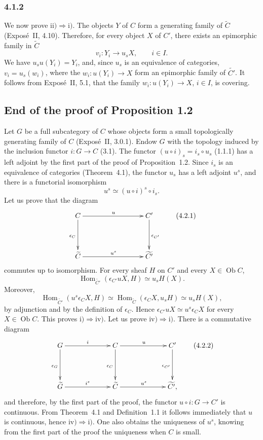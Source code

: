 \documentclass[11pt]{article}
\newcommand{\Hom}{\operatorname{Hom}}
\newcommand{\Ob}{\operatorname{Ob}}
\begin{document}
\subsubsection*{4.1.2}
We now prove \(\mathrm{ii)}\Rightarrow\mathrm{i)}\). The objects \(Y\) of \(C\) form a generating family of \(\widetilde C\) (Expos\'e~II, 4.10). Therefore, for every object \(X\) of \(C'\), there exists an epimorphic family in \(\widetilde C\)
\[
v_i:Y_i\to u_sX,
\qquad i\in I.
\]
We have \(u_su(Y_i)=Y_i\), and, since \(u_s\) is an equivalence of categories, \(v_i=u_s(w_i)\), where the \(w_i:u(Y_i)\to X\) form an epimorphic family of \(\widetilde{C'}\). It follows from Expos\'e~II, 5.1, that the family \(w_i:u(Y_i)\to X\), \(i\in I\), is covering.

\subsection{End of the proof of Proposition 1.2}
Let \(G\) be a full subcategory of \(C\) whose objects form a small topologically generating family of \(C\) (Expos\'e~II, 3.0.1). Endow \(G\) with the topology induced by the inclusion functor \(i:G\to C\) (3.1). The functor \((u\circ i)_s=i_s\circ u_s\) (1.1.1) has a left adjoint by the first part of the proof of Proposition~1.2. Since \(i_s\) is an equivalence of categories (Theorem~4.1), the functor \(u_s\) has a left adjoint \(u^s\), and there is a functorial isomorphism
\[
u^s\simeq (u\circ i)^s\circ i_s.
\]
Let us prove that the diagram
\[
\xymatrix@C=3cm@R=1.5cm{
C\ar[r]^{u}\ar[d]_{\epsilon_C}& C'\ar[d]^{\epsilon_{C'}}\\
\widetilde C\ar[r]^{u^s}& \widetilde{C'}
}
\tag{4.2.1}
\]
commutes up to isomorphism. For every sheaf \(H\) on \(C'\) and every \(X\in\Ob C\),
\[
\Hom_{\widetilde{C'}}(\epsilon_{C'}uX,H)\simeq u_sH(X).
\]
Moreover,
\[
\Hom_{\widetilde{C'}}(u^s\epsilon_CX,H)\simeq\Hom_{\widetilde C}(\epsilon_CX,u_sH)\simeq u_sH(X),
\]
by adjunction and by the definition of \(\epsilon_C\). Hence \(\epsilon_{C'}uX\simeq u^s\epsilon_CX\) for every \(X\in\Ob C\). This proves \(\mathrm{i)}\Rightarrow\mathrm{iv)}\). Let us prove \(\mathrm{iv)}\Rightarrow\mathrm{i)}\). There is a commutative diagram
\[
\xymatrix@C=2.25cm@R=1.5cm{
G\ar[r]^{i}\ar[d]_{\epsilon_G}& C\ar[r]^{u}\ar[d]_{\epsilon_C}& C'\ar[d]_{\epsilon_{C'}}\\
\widetilde G\ar[r]^{i^s}& \widetilde C\ar[r]^{u^s}& \widetilde{C'} ,
}
\tag{4.2.2}
\]
and therefore, by the first part of the proof, the functor \(u\circ i:G\to C'\) is continuous. From Theorem~4.1 and Definition~1.1 it follows immediately that \(u\) is continuous, hence \(\mathrm{iv)}\Rightarrow\mathrm{i)}\). One also obtains the uniqueness of \(u^s\), knowing from the first part of the proof the uniqueness when \(C\) is small.
\end{document}
